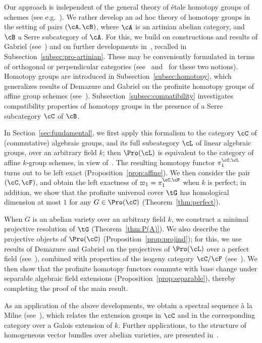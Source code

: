Our approach is independent of the general theory of \'etale homotopy groups of schemes (see e.g.~\cite{AM, Friedlander}). We rather develop an ad hoc theory of homotopy groups in the setting of pairs $(\cA,\cB)$, where $\cA$ is an artinian abelian category, and $\cB$ a Serre subcategory of $\cA$. For this, we build on constructions and results of Gabriel (see~\cite[Chap.~III]{Gabriel}) and on further developments in~\cite{Br17b}, recalled in Subsection~\ref{subsec:pro-artinian}. These may be conveniently formulated in terms of orthogonal or perpendicular categories (see~\cite[II.2]{BR} and~\cite{GL} for these two notions). Homotopy groups are introduced in Subsection~\ref{subsec:homotopy}, which generalizes results of Demazure and Gabriel on the profinite homotopy groups of affine group schemes (see~\cite[V.3.3]{DG}). Subsection~\ref{subsec:compatibility} investigates compatibility properties of homotopy groups in the presence of a Serre subcategory $\cC$ of $\cB$.

In Section~\ref{sec:fundamental}, we first apply this formalism to the category $\cC$ of (commutative) algebraic groups, and its full subcategory $\cL$ of linear algebraic groups, over an arbitrary field $k$; then $\Pro(\cL)$ is equivalent to the category of affine $k$-group schemes, in view of~\cite[V.2.2.2]{DG}. The resulting homotopy functor $\pi_1^{\cC,\cL}$ turns out to be left exact (Proposition~\ref{prop:affine}). We then consider the pair $(\cC,\cF)$, and obtain the left exactness of $\varpi_1 = \pi_1^{\cC,\cF}$ when $k$ is perfect; in addition, we show that the profinite universal cover $\tG$ has homological dimension at most $1$ for any $G \in \Pro(\cC)$ (Theorem~\ref{thm:perfect}).

When $G$ is an abelian variety over an arbitrary field $k$, we construct a minimal projective resolution of $\tG$ (Theorem~\ref{thm:P(A)}). We also describe the projective objects of $\Pro(\cC)$ (Proposition~\ref{prop:projind}); for this, we use results of Demazure and Gabriel on the projectives of $\Pro(\cL)$ over a perfect field (see~\cite[V.3.7]{DG}), combined with properties of the isogeny category $\cC/\cF$ (see~\cite{Br17a}). We then show that the profinite homotopy functors commute with base change under separable algebraic field extensions (Proposition~\ref{prop:separable}), thereby completing the proof of the main result.

As an application of the above developments, we obtain a spectral sequence \`a la Milne (see~\cite{Milne}), which relates the extension groups in $\cC$ and in the corresponding category over a Galois extension of $k$. Further applications, to the structure of homogeneous vector bundles over abelian varieties, are presented in~\cite{Br18}.

